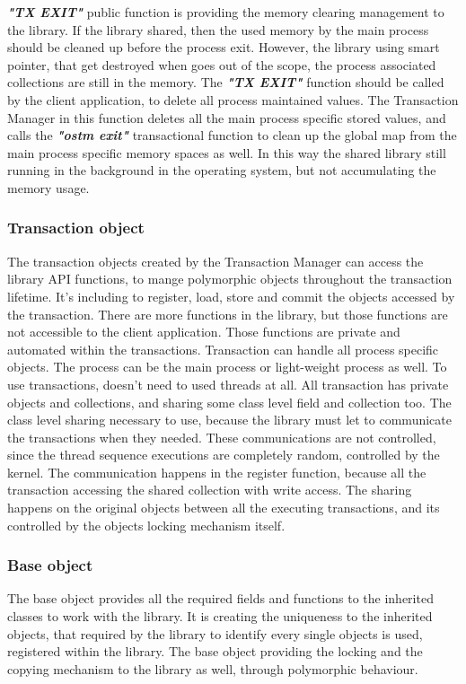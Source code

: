 \documentclass[12pt]{article}
\begin{document}
\textbf{\textit{"TX EXIT"}} public function is providing the memory clearing management to the library. If the library shared, then the used memory by the main process should be cleaned up before the process exit. However, the library using smart pointer, that get destroyed when goes out of the scope, the process associated collections are still in the memory. The \textbf{\textit{"TX EXIT"}} function should be called by the client application, to delete all process maintained values. The Transaction Manager in this function deletes all the main process specific stored values, and calls the \textbf{\textit{"ostm exit"}} transactional function to clean up the global map from the main process specific memory spaces as well. In this way the shared library still running in the background in the operating system, but not accumulating the memory usage. \\ 

\subsubsection{Transaction object}
The transaction objects created by the Transaction Manager can access the library API functions, to mange polymorphic objects throughout the transaction lifetime. It's including to register, load, store and commit the objects accessed by the transaction. There are more functions in the library, but those functions are not accessible to the client application. Those functions are private and automated within the transactions. Transaction can handle all process specific objects. The process can be the main process or light-weight process as well. To use transactions, doesn't need to used threads at all. All transaction has private objects and collections, and sharing some class level field and collection too. The class level sharing necessary to use, because the library must let to communicate the transactions when they needed. These communications are not controlled, since the thread sequence executions are completely random, controlled by the kernel. The communication happens in the register function, because all the transaction accessing the shared collection with write access. The sharing happens on the original objects between all the executing transactions, and its controlled by the objects locking mechanism itself.  

\subsubsection{Base object}
The base object provides all the required fields and functions to the inherited classes to work with the library. It is creating the uniqueness to the inherited objects, that required by the library to identify every single objects is used, registered within the library. The base object providing the locking and the copying mechanism to the library as well, through polymorphic behaviour. 
  
\end{document}
